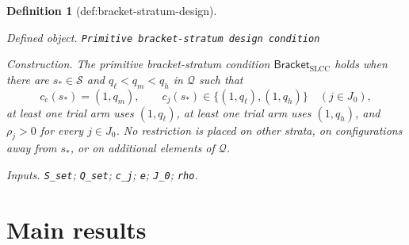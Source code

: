 \documentclass{article}
\newtheorem{definition}{Definition}
\begin{document}
\begin{definition}[def:bracket-stratum-design]\label{def:bracket-stratum-design}
\par\smallskip\noindent\emph{Defined object.} \texttt{Primitive bracket-\allowbreak{}stratum design condition}
\par\smallskip\noindent\emph{Construction.} The primitive bracket-stratum condition \(\mathsf{Bracket}_{\mathrm{SLCC}}\) holds when there are \(s_*\in\mathcal S\) and \(q_\ell<q_m<q_h\) in \(\mathcal Q\) such that
\[
c_e(s_*)=(1,q_m),\qquad
c_j(s_*)\in\{(1,q_\ell),(1,q_h)\}\quad(j\in J_0),
\]
at least one trial arm uses \((1,q_\ell)\), at least one trial arm uses \((1,q_h)\), and \(\rho_j>0\) for every \(j\in J_0\).  No restriction is placed on other strata, on configurations away from \(s_*\), or on additional elements of \(\mathcal Q\).
\par\smallskip\noindent\emph{Inputs.} \texttt{S\_\allowbreak{}set}; \texttt{Q\_\allowbreak{}set}; \texttt{c\_\allowbreak{}j}; \texttt{e}; \texttt{J\_\allowbreak{}0}; \texttt{rho}.
\end{definition}

\section{Main results}
\end{document}
